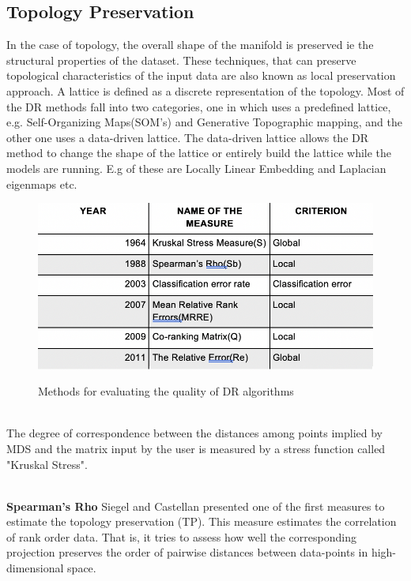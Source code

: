 \documentclass[letterpaper, 10 pt, conference]{ieeeconf}  %
\begin{document}
\subsection{Topology Preservation}
In the case of topology, the overall shape of the manifold is preserved ie the structural properties of the dataset. These techniques, that can preserve topological characteristics of the input data are also known as local preservation approach. A lattice is defined as a discrete representation of the topology. Most of the DR methods fall into two categories, one in which uses a predefined lattice, e.g. Self-Organizing Maps(SOM’s) and Generative Topographic mapping, and the other one uses a data-driven lattice. The data-driven lattice allows the DR method to change the shape of the lattice or entirely build the lattice while the models are running. E.g of these are Locally Linear Embedding and Laplacian eigenmaps etc.
\begin{figure}[h!]
	\centering
	\includegraphics[width=0.94\linewidth]{table.png}
	\label{fig:table.png}
	\caption{Methods for evaluating the quality of DR algorithms}
\end{figure}

\\The degree of correspondence between the distances among points implied by MDS and the matrix input by the user is measured by a stress function called "Kruskal Stress".
\vspace{2mm}

\\\textbf{Spearman's Rho} Siegel and Castellan presented one of the first measures to estimate the topology preservation (TP). This measure estimates the correlation of rank order data. That is, it tries to assess how well the corresponding projection preserves the order of pairwise distances between data-points in high- dimensional space.
\vspace{2mm}
\end{document}
